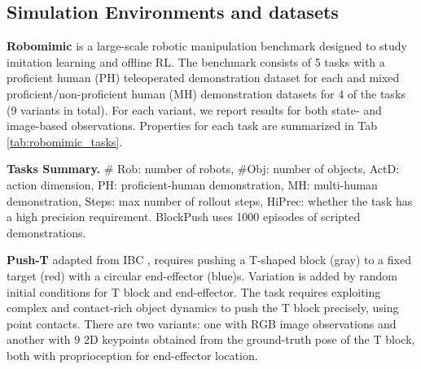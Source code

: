 \subsection{Simulation Environments and datasets}
\textbf{Robomimic}
\cite{robomimic} is a large-scale robotic manipulation benchmark designed to study imitation learning and offline RL. The benchmark consists of 5 tasks with a proficient human (PH) teleoperated demonstration dataset for each and mixed proficient/non-proficient human (MH) demonstration datasets for 4 of the tasks (9 variants in total). For each variant, we report results for both state- and image-based observations. Properties for each task are summarized in Tab \ref{tab:robomimic_tasks}.

\begin{table}
\centering

\caption{\textbf{Tasks Summary.} \# Rob: number of robots, \#Obj: number of objects, ActD: action dimension, PH: proficient-human demonstration, MH: multi-human demonstration, Steps: max number of rollout steps, HiPrec: whether the task has a high precision requirement. BlockPush uses 1000 episodes of scripted  demonstrations.}
\label{tab:robomimic_tasks} 
\vspace{-5mm}
\end{table}

\textbf{Push-T}
\label{sec:eval_sim_pusht}
adapted from IBC \cite{ibc}, requires pushing a T-shaped block (gray) to a fixed target (red) with a circular end-effector (blue)s. Variation is added by random initial conditions for T block and end-effector. The task requires exploiting complex and contact-rich object dynamics to push the T block precisely, using point contacts. There are two variants: one with RGB image observations and another with 9 2D keypoints obtained from the ground-truth pose of the T block, both with proprioception for end-effector location.

